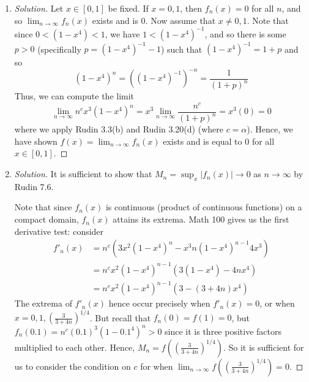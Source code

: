 \documentclass{article}
\theoremstyle{remark}
\begin{document}
\begin{enumerate}
	\item \begin{proof}[Solution]\let\qed\relax
			Let $x \in [0,1]$ be fixed.
			If $x = 0,1$, then $f_n(x) = 0$ for all $n$,
			and so $\lim_{n\to\infty} f_n(x)$ exists and is $0$.
			Now assume that $x \neq0,1$.
			Note that since $0 < (1-x^4) < 1$,
			we have $1 < (1 - x^4)^{-1}$,
			and so there is some $p > 0$ (specifically $p = (1 - x^4)^{-1} - 1$)
			such that $(1-x^4)^{-1} = 1+p$
			and so
			\[
				(1 - x^4)^n = ((1-x^4)^{-1})^{-n}
				= \frac{1}{(1+p)^n}
			\]
			Thus, we can compute the limit
			\[
				\lim_{n\to\infty} n^c x^3 (1-x^4)^n
				= x^3 \lim_{n\to\infty} \frac{n^c}{(1+p)^n}
				= x^3(0) = 0
			\]
			where we apply Rudin 3.3(b) and Rudin 3.20(d)
			(where $c = \alpha$).
			Hence, we have shown $f(x) = \lim_{n\to\infty} f_n(x)$
			exists and is equal to $0$ for all $x \in [0,1]$.
	\end{proof}
	\item \begin{proof}[Solution]\let\qed\relax
		It is sufficient to show that $M_n = \sup_x |f_n(x)| \to 0$
		as $n \to \infty$ by Rudin 7.6.

		Note that since $f_n(x)$ is continuous 
		(product of continuous functions) on a compact domain,
		$f_n(x)$ attains its extrema.
		Math 100 gives us the first derivative test:
		consider
		\begin{align*}
			f'_n(x)
			&= n^c(3x^2(1-x^4)^n - x^3n(1-x^4)^{n-1}4x^3)\\
			&= n^cx^2(1-x^4)^{n-1}(3(1-x^4) - 4nx^4)\\
			&= n^cx^2(1-x^4)^{n-1}(3 - (3+4n)x^4)
		\end{align*}
		The extrema of $f'_n(x)$ hence occur precisely when $f'_n(x) = 0$,
		or when $x = 0, 1, \left(\frac{3}{3+4n}\right)^{1/4}$.
		But recall that $f_n(0) = f(1) = 0$, but
		$f_n(0.1) = n^c(0.1)^3(1-0.1^4)^n > 0$ since it is three positive factors
		multiplied to each other.
		Hence, $M_n = f\left(\left(\frac{3}{3+4n}\right)^{1/4}\right)$.
		So it is sufficient for us to consider the condition on $c$
		for when $\lim_{n\to\infty} f\left(\left(\frac{3}{3+4n}\right)^{1/4}\right) = 0$.


\end{proof}
\end{enumerate}
\end{document}
